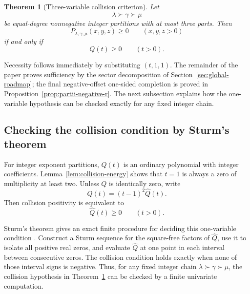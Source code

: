 \documentclass[11pt]{article}
\newtheorem{theorem}{Theorem}[section]
\theoremstyle{definition}
\begin{document}
\begin{theorem}[Three-variable collision criterion]\label{thm:main}
Let
\begin{equation*}
\lambda\succ\gamma\succ\mu
\end{equation*}
be equal-degree nonnegative integer partitions with at most three parts.  Then
\begin{equation*}
P_{\lambda,\gamma,\mu}(x,y,z)\ge0
\qquad(x,y,z>0)
\end{equation*}
if and only if
\begin{equation*}
Q(t)\ge0
\qquad(t>0).
\end{equation*}
\end{theorem}

Necessity follows immediately by substituting \((t,1,1)\).  The remainder of the paper proves sufficiency by the sector decomposition of Section~\ref{sec:global-roadmap}; the final negative-offset one-sided completion is proved in Proposition~\ref{prop:partii-negative-r}.  The next subsection explains how the one-variable hypothesis can be checked exactly for any fixed integer chain.

\subsection{Checking the collision condition by Sturm's theorem}

For integer exponent partitions, \(Q(t)\) is an ordinary polynomial with integer coefficients.  Lemma~\ref{lem:collision-energy} shows that \(t=1\) is always a zero of multiplicity at least two.  Unless \(Q\) is identically zero, write
\begin{equation*}
Q(t)=(t-1)^2\widehat Q(t).
\end{equation*}
Then collision positivity is equivalent to
\begin{equation*}
\widehat Q(t)\ge0
\qquad(t>0).
\end{equation*}

Sturm's theorem gives an exact finite procedure for deciding this one-variable condition \cite{BPR2006}.  Construct a Sturm sequence for the square-free factors of \(\widehat Q\), use it to isolate all positive real zeros, and evaluate \(\widehat Q\) at one point in each interval between consecutive zeros.  The collision condition holds exactly when none of those interval signs is negative.  Thus, for any fixed integer chain \(\lambda\succ\gamma\succ\mu\), the collision hypothesis in Theorem~\ref{thm:main} can be checked by a finite univariate computation.
\end{document}
